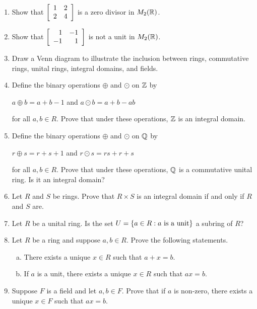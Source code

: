 \documentclass[11pt,fleqn,dvipsnames,usenames]{article}
\begin{document}
\begin{enumerate}[1.]
\item Show that $\MATRIX{rr}{1 & 2\\2 & 4}$ is a zero divisor in $M_{2}(\REAL)$.

\item Show that $\MATRIX{rr}{1 & -1\\-1 & 1}$ is not a unit in $M_{2}(\REAL)$.

\item Draw a Venn diagram to illustrate the inclusion between rings, commutative rings, unital rings, integral domains, and fields.

\item Define the binary operations $\oplus$ and $\odot$ on $\Z$ by
\begin{center}
$a\oplus b = a + b - 1$ and $a\odot b = a + b - ab$
\end{center}
for all $a,b\in R$.  Prove that under these operations, $\Z$ is an integral domain.

\item Define the binary operations $\oplus$ and $\odot$ on $\Q$ by
\begin{center}
$r\oplus s = r + s + 1$ and $r\odot s = rs + r + s$
\end{center}
for all $a,b\in R$.  Prove that under these operations, $\Q$ is a commutative unital ring.  Is it an integral domain?

\item Let $R$ and $S$ be rings.  Prove that $R\times S$ is an integral domain if and only if $R$ and $S$ are.

\item Let $R$ be a unital ring.  Is the set $U = \SET{a\in R:a\text{ is a unit}}$ a subring of $R$?

\item Let $R$ be a ring and suppose $a,b\in R$.  Prove the following statements.
\begin{enumerate}[(a)]
\item There exists a unique $x\in R$ such that $a + x = b$.
\item If $a$ is a unit, there exists a unique $x\in R$ such that $ax=b$.   
\end{enumerate}

\item Suppose $F$ is a field and let $a,b\in F$.  Prove that if $a$ is non-zero, there exists a unique $x\in F$ such that $ax = b$.
\end{enumerate}
\newpage
\end{document}
